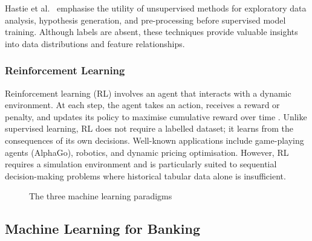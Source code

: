Hastie et al.\ \cite{hastie2009} emphasise the utility of unsupervised methods for
exploratory data analysis, hypothesis generation, and pre-processing before supervised
model training. Although labels are absent, these techniques provide valuable insights
into data distributions and feature relationships.

\subsubsection{Reinforcement Learning}

Reinforcement learning (RL) involves an agent that interacts with a dynamic environment.
At each step, the agent takes an action, receives a reward or penalty, and updates its
policy to maximise cumulative reward over time \cite{hastie2009}. Unlike supervised
learning, RL does not require a labelled dataset; it learns from the consequences of its
own decisions. Well-known applications include game-playing agents (AlphaGo), robotics, and
dynamic pricing optimisation. However, RL requires a simulation environment and is
particularly suited to sequential decision-making problems where historical tabular data
alone is insufficient.

\begin{figure}[H]
\centering
{}
\caption{The three machine learning paradigms \cite{mitchell1997, hastie2009}}
\label{fig:ml_paradigms_fig}
\end{figure}

\subsection{Machine Learning for Banking}

